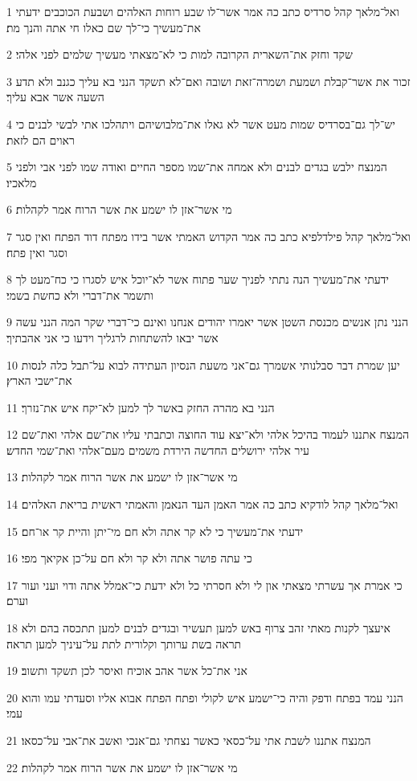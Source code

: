 \par 1 ואל־מלאך קהל סרדיס כתב כה אמר אשר־לו שבע רוחות האלהים ושבעת הכוכבים ידעתי את־מעשיך כי־לך שם כאלו חי אתה והנך מת׃
\par 2 שקד וחזק את־השארית הקרובה למות כי לא־מצאתי מעשיך שלמים לפני אלהי׃
\par 3 זכור את אשר־קבלת ושמעת ושמרה־זאת ושובה ואם־לא תשקד הנני בא עליך כגנב ולא תדע השעה אשר אבא עליך׃
\par 4 יש־לך גם־בסרדיס שמות מעט אשר לא גאלו את־מלבושיהם ויתהלכו אתי לבשי לבנים כי ראוים הם לזאת׃
\par 5 המנצח ילבש בגדים לבנים ולא אמחה את־שמו מספר החיים ואודה שמו לפני אבי ולפני מלאכיו׃
\par 6 מי אשר־אזן לו ישמע את אשר הרוח אמר לקהלות׃
\par 7 ואל־מלאך קהל פילדלפיא כתב כה אמר הקדוש האמתי אשר בידו מפתח דוד הפתח ואין סגר וסגר ואין פתח׃
\par 8 ידעתי את־מעשיך הנה נתתי לפניך שער פתוח אשר לא־יוכל איש לסגרו כי כח־מעט לך ותשמר את־דברי ולא כחשת בשמי׃
\par 9 הנני נתן אנשים מכנסת השטן אשר יאמרו יהודים אנחנו ואינם כי־דברי שקר המה הנני עשה אשר יבאו להשתחות לרגליך וידעו כי אני אהבתיך׃
\par 10 יען שמרת דבר סבלנותי אשמרך גם־אני משעת הנסיון העתידה לבוא על־תבל כלה לנסות את־ישבי הארץ׃
\par 11 הנני בא מהרה החזק באשר לך למען לא־יקח איש את־נזרך׃
\par 12 המנצח אתננו לעמוד בהיכל אלהי ולא־יצא עוד החוצה וכתבתי עליו את־שם אלהי ואת־שם עיר אלהי ירושלים החדשה הירדת משמים מעם־אלהי ואת־שמי החדש׃
\par 13 מי אשר־אזן לו ישמע את אשר הרוח אמר לקהלות׃
\par 14 ואל־מלאך קהל לודקיא כתב כה אמר האמן העד הנאמן והאמתי ראשית בריאת האלהים׃
\par 15 ידעתי את־מעשיך כי לא קר אתה ולא חם מי־יתן והיית קר או־חם׃
\par 16 כי עתה פושר אתה ולא קר ולא חם על־כן אקיאך מפי׃
\par 17 כי אמרת אך עשרתי מצאתי און לי ולא חסרתי כל ולא ידעת כי־אמלל אתה ודוי ועני ועור וערם׃
\par 18 איעצך לקנות מאתי זהב צרוף באש למען תעשיר ובגדים לבנים למען תתכסה בהם ולא תראה בשת ערותך וקלורית לתת על־עיניך למען תראה׃
\par 19 אני את־כל אשר אהב אוכיח ואיסר לכן תשקד ותשוב׃
\par 20 הנני עמד בפתח ודפק והיה כי־ישמע איש לקולי ופתח הפתח אבוא אליו וסעדתי עמו והוא עמי׃
\par 21 המנצח אתננו לשבת אתי על־כסאי כאשר נצחתי גם־אנכי ואשב את־אבי על־כסאו׃
\par 22 מי אשר־אזן לו ישמע את אשר הרוח אמר לקהלות׃

